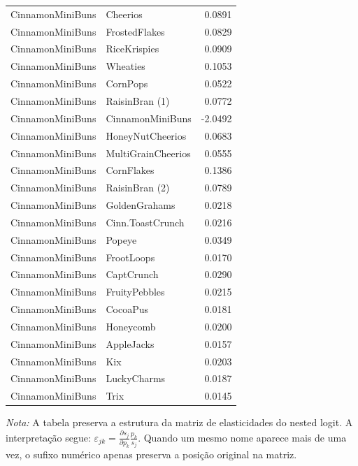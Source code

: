 \begin{table}[H]
\begin{tabular}{llr}
CinnamonMiniBuns & Cheerios & 0.0891 \\
CinnamonMiniBuns & FrostedFlakes & 0.0829 \\
CinnamonMiniBuns & RiceKrispies & 0.0909 \\
CinnamonMiniBuns & Wheaties & 0.1053 \\
CinnamonMiniBuns & CornPops & 0.0522 \\
CinnamonMiniBuns & RaisinBran (1) & 0.0772 \\
CinnamonMiniBuns & CinnamonMiniBuns & -2.0492 \\
CinnamonMiniBuns & HoneyNutCheerios & 0.0683 \\
CinnamonMiniBuns & MultiGrainCheerios & 0.0555 \\
CinnamonMiniBuns & CornFlakes & 0.1386 \\
CinnamonMiniBuns & RaisinBran (2) & 0.0789 \\
CinnamonMiniBuns & GoldenGrahams & 0.0218 \\
CinnamonMiniBuns & Cinn.ToastCrunch & 0.0216 \\
CinnamonMiniBuns & Popeye & 0.0349 \\
CinnamonMiniBuns & FrootLoops & 0.0170 \\
CinnamonMiniBuns & CaptCrunch & 0.0290 \\
CinnamonMiniBuns & FruityPebbles & 0.0215 \\
CinnamonMiniBuns & CocoaPus & 0.0181 \\
CinnamonMiniBuns & Honeycomb & 0.0200 \\
CinnamonMiniBuns & AppleJacks & 0.0157 \\
CinnamonMiniBuns & Kix & 0.0203 \\
CinnamonMiniBuns & LuckyCharms & 0.0187 \\
CinnamonMiniBuns & Trix & 0.0145 \\
\bottomrule
\end{tabular}

\vspace{0.3em}
\footnotesize
\textit{Nota:} A tabela preserva a estrutura da matriz de elasticidades do nested logit. A interpretação segue: $\varepsilon_{jk}=\frac{\partial s_j}{\partial p_k}\frac{p_k}{s_j}$. Quando um mesmo nome aparece mais de uma vez, o sufixo numérico apenas preserva a posição original na matriz.
\end{table}
\endgroup


